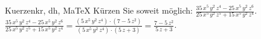 \begin{MAufgabe}{Kuerzen}{kr, dh, MaTeX}
K\"urzen Sie soweit m\"oglich: $\frac{35\, x^5\, y^2\, z^4 - 25\, x^5\, y^2\, z^6}{25\, x^5\, y^2\, z^5 + 15\, x^5\, y^2\, z^4}$.\\ 
\ifLsg\MLoesung
\quad $\frac{35\, x^5\, y^2\, z^4 - 25\, x^5\, y^2\, z^6}{25\, x^5\, y^2\, z^5 + 15\, x^5\, y^2\, z^4}=\frac{(5\, x^5\, y^2\, z^4)\cdot(7 - 5\, z^2)}{(5\, x^5\, y^2\, z^4)\cdot(5\, z + 3)}=\frac{7 - 5\, z^2}{5\, z + 3}$.\else\relax\fi
 \end{MAufgabe}